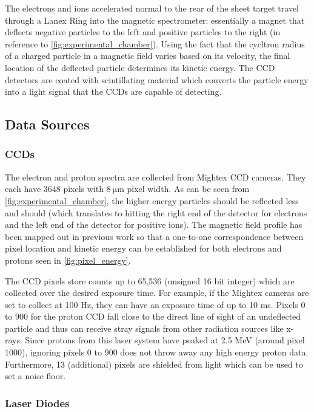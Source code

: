 The electrons and ions accelerated normal to the rear of the sheet target travel through a Lanex Ring into the magnetic spectrometer: essentially a magnet that deflects negative particles to the left and positive particles to the right (in reference to \autoref{fig:experimental_chamber}). Using the fact that the cycltron radius of a charged particle in a magnetic field varies based on its velocity, the final location of the deflected particle determines its kinetic energy. The \gls{CCD} detectors are coated with scintillating material which converts the particle energy into a light signal that the \gls{CCD}s are capable of detecting.  

\subsection{Data Sources}

\subsubsection{CCDs}

The electron and proton spectra are collected from Mightex \gls{CCD} cameras. They each have 3648 pixels with $\SI{8}{\micro \meter}$ pixel width. As can be seen from \autoref{fig:experimental_chamber}, the higher energy particles should be reflected less and should (which translates to hitting the right end of the detector for electrons and the left end of the detector for positive ions). The magnetic field profile has been mapped out in previous work \cite{Morrison_2018_NJoP} so that a one-to-one correspondence between pixel location and kinetic energy can be established for both electrons and protons seen in \autoref{fig:pixel_energy}. 

The CCD pixels store counts up to 65,536 (unsigned 16 bit integer) which are collected over the desired exposure time. For example, if the Mightex cameras are set to collect at 100 Hz, they can have an exposure time of up to 10 ms. Pixels 0 to 900 for the proton CCD fall close to the direct line of sight of an undeflected particle and thus can receive stray signals from other radiation sources like x-rays. Since protons from this laser system have peaked at 2.5 MeV \cite{Morrison_2018_NJoP} (around pixel 1000), ignoring pixels 0 to 900 does not throw away any high energy proton data. Furthermore, 13 (additional) pixels are shielded from light which can be used to set a noise floor.

\subsubsection{Laser Diodes}


